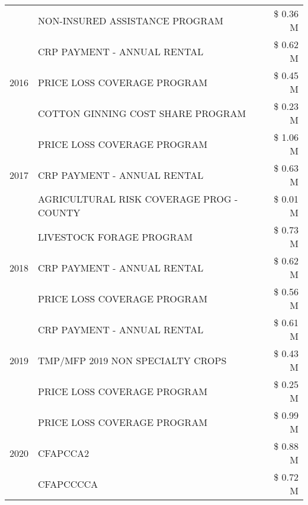 \begin{tabular}{llr}
 & NON-INSURED ASSISTANCE PROGRAM & \$ 0.36 M \\
\cline{1-3}
\multirow[t]{3}{*}{2016} & CRP PAYMENT - ANNUAL RENTAL & \$ 0.62 M \\
 & PRICE LOSS COVERAGE PROGRAM & \$ 0.45 M \\
 & COTTON GINNING COST SHARE PROGRAM & \$ 0.23 M \\
\cline{1-3}
\multirow[t]{3}{*}{2017} & PRICE LOSS COVERAGE PROGRAM & \$ 1.06 M \\
 & CRP PAYMENT - ANNUAL RENTAL & \$ 0.63 M \\
 & AGRICULTURAL RISK COVERAGE PROG - COUNTY & \$ 0.01 M \\
\cline{1-3}
\multirow[t]{3}{*}{2018} & LIVESTOCK FORAGE PROGRAM & \$ 0.73 M \\
 & CRP PAYMENT - ANNUAL RENTAL & \$ 0.62 M \\
 & PRICE LOSS COVERAGE PROGRAM & \$ 0.56 M \\
\cline{1-3}
\multirow[t]{3}{*}{2019} & CRP PAYMENT - ANNUAL RENTAL & \$ 0.61 M \\
 & TMP/MFP 2019 NON SPECIALTY CROPS & \$ 0.43 M \\
 & PRICE LOSS COVERAGE PROGRAM & \$ 0.25 M \\
\cline{1-3}
\multirow[t]{3}{*}{2020} & PRICE LOSS COVERAGE PROGRAM & \$ 0.99 M \\
 & CFAPCCA2 & \$ 0.88 M \\
 & CFAPCCCCA & \$ 0.72 M \\
\cline{1-3}
\bottomrule
\end{tabular}
